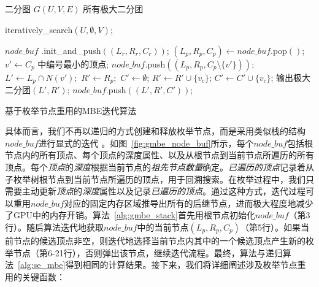 \begin{algorithm} [H]
  \begin{algorithmic}[1]
    \normalsize
    \REQUIRE 二分图 $G(U,V,E)$
    \ENSURE 所有极大二分团
    
    \renewcommand{\algorithmicwhile}{\textbf{procedure}}
    \renewcommand{\algorithmicdo}{\textbf{:}}
    \STATE \textsf{iteratively\_search}$(U,\emptyset,V)$;

    \renewcommand{\algorithmicwhile}{\textbf{while}}
    \renewcommand{\algorithmicdo}{\textbf{do}}
      \STATE $node\_buf$ \textsf{.init\_and\_push}$((L_r,R_r,C_r))$;
        \STATE $(L_p, R_p, C_p) \leftarrow node\_buf$\textsf{.pop}$()$;
          \STATE $v' \leftarrow C_p$ 中编号最小的顶点; 
          \STATE $node\_buf$\textsf{.push}$((L_p,R_p,C_p \setminus \{v'\} ))$;
          \STATE $L' \leftarrow L_p \cap N(v');$ $R'\leftarrow R_p;$ $C' \leftarrow \emptyset$;
              \STATE $R' \leftarrow R' \cup \{v_c\}$;
              \STATE $C' \leftarrow C' \cup \{v_c\}$;
            \ENDIF
          \ENDFOR
            \STATE 输出极大二分团$(L', R')$;
            \STATE $node\_buf$\textsf{.push}$((L',R',C'))$;
          \ENDIF
        \ENDIF
        
      \ENDWHILE
    \ENDWHILE

  \end{algorithmic}
  \caption{基于枚举节点重用的MBE迭代算法}
  \label{alg:gmbe_stack}
\end{algorithm}


具体而言，我们不再以递归的方式创建和释放枚举节点，而是采用类似栈的结构$node\_buf$进行显式的迭代 。如图~\ref{fig:gmbe_node_buf}所示，每个$node\_buf$包括根节点内的所有顶点、每个顶点的深度属性、以及从根节点到当前节点所遍历的所有顶点。每个\textit{顶点}的\emph{\textit{深度}}根据当前节点的\emph{祖先节点数量}确定。\textit{已遍历的顶点}记录着从子枚举树根节点到当前节点所遍历的顶点，用于回溯搜索。在枚举过程中，我们只需要主动更新\textit{顶点}的\textit{深度}属性以及记录\textit{已遍历的顶点}。通过这种方式，迭代过程可以重用$node\_buf$对应的固定内存区域推导出所有的后继节点，进而极大程度地减少了GPU中的内存开销。算法~\ref{alg:gmbe_stack}首先用根节点初始化$node\_buf$（第3行）。随后算法迭代地获取$node\_buf$中的当前节点$(L_p,R_p,C_p)$（第5行）。如果当前节点的候选顶点非空，则迭代地选择当前节点内其中的一个候选顶点产生新的枚举节点（第6-21行），否则弹出该节点，继续迭代流程。最终，算法与递归算法~\ref{alg:se_mbe}得到相同的计算结果。接下来，我们将详细阐述涉及枚举节点重用的关键函数：


